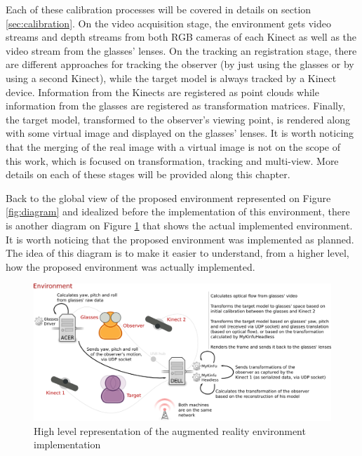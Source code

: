 \documentclass[msc, a4paper, classic, en]{ufbathesis}
\begin{document}
Each of these calibration processes will be covered in details on section \ref{sec:calibration}. On the video acquisition stage, the environment gets video streams and depth streams from both RGB cameras of each Kinect as well as the video stream from the glasses' lenses. On the tracking an registration stage, there are different approaches for tracking the observer (by just using the glasses or by using a second Kinect), while the target model is always tracked by a Kinect device. Information from the Kinects are registered as point clouds while information from the glasses are registered as transformation matrices. Finally, the target model, transformed to the observer's viewing point, is rendered along with some virtual image and displayed on the glasses' lenses. It is worth noticing that the merging of the real image with a virtual image is not on the scope of this work, which is focused on transformation, tracking and multi-view. More details on each of these stages will be provided along this chapter.

Back to the global view of the proposed environment represented on Figure \ref{fig:diagram} and idealized before the implementation of this environment, there is another diagram on Figure \ref{fig:env} that shows the actual implemented environment. It is worth noticing that the proposed environment was implemented as planned. The idea of this diagram is to make it easier to understand, from a higher level, how the proposed environment was actually implemented.

\begin{figure}
\centering
\includegraphics[width=1\textwidth]{images/env.png}
\caption{High level representation of the augmented reality environment implementation}
\label{fig:env}
\end{figure}
\end{document}

